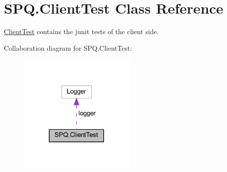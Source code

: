 \hypertarget{class_s_p_q_1_1_client_test}{}\section{S\+P\+Q.\+Client\+Test Class Reference}
\label{class_s_p_q_1_1_client_test}


\mbox{\hyperlink{class_s_p_q_1_1_client_test}{Client\+Test}} contains the junit tests of the client side.  




Collaboration diagram for S\+P\+Q.\+Client\+Test\+:\nopagebreak
\begin{figure}[H]
\begin{center}
\leavevmode
\includegraphics[width=164pt]{class_s_p_q_1_1_client_test__coll__graph}
\end{center}
\end{figure}
